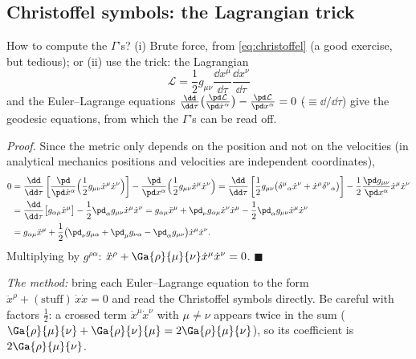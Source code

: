 \subsection{Christoffel symbols: the Lagrangian trick}
How to compute the $\Gamma$'s? (i) Brute force, from \eqref{eq:christoffel} (a good exercise, but tedious); or (ii) use the trick: the Lagrangian
\[
  \mathcal L=\frac12g_{\mu\nu}\frac{\dd x^\mu}{\dd\tau}\frac{\dd x^\nu}{\dd\tau}
\]
and the Euler--Lagrange equations $\frac{\dd}{\dd\tau}\big(\frac{\pd\mathcal L}{\pd\dot x^\alpha}\big)-\frac{\pd\mathcal L}{\pd x^\alpha}=0$ ($\dot{}\equiv\dd/\dd\tau$) give the geodesic equations, from which the $\Gamma$'s can be read off.

\textit{Proof.} Since the metric only depends on the position and not on the velocities (in analytical mechanics positions and velocities are independent coordinates),
\begin{align*}
  0&=\frac{\dd}{\dd\tau}\left[\frac{\pd}{\pd\dot x^\alpha}\Big(\frac12g_{\mu\nu}\dot x^\mu\dot x^\nu\Big)\right]-\frac{\pd}{\pd x^\alpha}\Big(\frac12g_{\mu\nu}\dot x^\mu\dot x^\nu\Big)
   =\frac{\dd}{\dd\tau}\left[\frac12g_{\mu\nu}\big(\delta^\mu{}_\alpha\dot x^\nu+\dot x^\mu\delta^\nu{}_\alpha\big)\right]-\frac12\frac{\pd g_{\mu\nu}}{\pd x^\alpha}\dot x^\mu\dot x^\nu\\
  &=\frac{\dd}{\dd\tau}\big[g_{\alpha\mu}\dot x^\mu\big]-\frac12\pd_\alpha g_{\mu\nu}\dot x^\mu\dot x^\nu
   =g_{\alpha\mu}\ddot x^\mu+\pd_\nu g_{\alpha\mu}\dot x^\nu\dot x^\mu-\frac12\pd_\alpha g_{\mu\nu}\dot x^\mu\dot x^\nu\\
  &=g_{\alpha\mu}\ddot x^\mu+\frac12\big(\pd_\nu g_{\mu\alpha}+\pd_\mu g_{\nu\alpha}-\pd_\alpha g_{\mu\nu}\big)\dot x^\mu\dot x^\nu .
\end{align*}
Multiplying by $g^{\rho\alpha}$: $\ddot x^\rho+\Ga{\rho}{\mu}{\nu}\dot x^\mu\dot x^\nu=0$. $\blacksquare$

\emph{The method:} bring each Euler--Lagrange equation to the form $\ddot x^\rho+(\text{stuff})\,\dot x\dot x=0$ and read the Christoffel symbols directly. Be careful with factors $\frac12$: a crossed term $\dot x^\mu\dot x^\nu$ with $\mu\neq\nu$ appears twice in the sum ($\Ga{\rho}{\mu}{\nu}+\Ga{\rho}{\nu}{\mu}=2\Ga{\rho}{\mu}{\nu}$), so its coefficient is $2\Ga{\rho}{\mu}{\nu}$.

